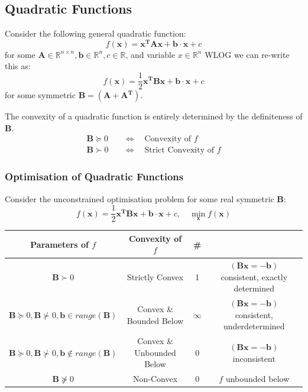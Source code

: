 \subsection{Quadratic Functions}
Consider the following general quadratic function:
\[f(\mathbf{x})=\mathbf{x^{T}Ax+b\cdot x}+c\]
for some $\mathbf{A}\in \mathbb{R}^{n\times n},\mathbf{b}\in
\mathbb{R}^{n},c\in \mathbb{R}$, and variable $x\in \mathbb{R}^{n}$
WLOG we can re-write this as:
\[f(\mathbf{x})=\frac{1}{2}\mathbf{x^{T}Bx+b\cdot x}+c\]
for some symmetric $\mathbf{B}=(\mathbf{A+A^{T}})$.
\begin{theorem}
  The convexity of a quadratic function is entirely determined by the
  definiteness of $\mathbf{B}$.
  \begin{align*}
      \mathbf{B} \succeq 0 \quad &\iff \quad \mbox{Convexity of }f \\
      \mathbf{B} \succ 0 \quad &\iff \quad \mbox{Strict Convexity of }f
  \end{align*}
\end{theorem}
\subsubsection{Optimisation of Quadratic Functions}
Consider the unconstrained optimisation problem for some real symmetric $\mathbf{B}$:
\[f(\mathbf{x})=\frac{1}{2}\mathbf{x^{T}Bx+b\cdot x}+c, \quad \min_{\mathbf{x}}f(\mathbf{x})\]

\begin{tabular}{c c c c}
  \toprule
  Parameters of $f$& Convexity of $f$ & \# &  \\
  \midrule
  $\mathbf{B}\succ 0$ & Strictly Convex & 1 & $\mathbf{(Bx=-b)}$ consistent, exactly determined \\
  $\mathbf{B}\succeq 0,\mathbf{B}\nsucc 0,\mathbf{b}\in range(\mathbf{B})$ & Convex \& Bounded Below & $\infty$ & $(\mathbf{Bx=-b})$ consistent, underdetermined \\
  $\mathbf{B}\succeq 0,\mathbf{B}\nsucc 0, \mathbf{b}\notin range(\mathbf{B})$ & Convex \& Unbounded Below & 0 & $(\mathbf{Bx=-b})$ inconsistent \\
  $\mathbf{B}\nsucceq 0$ & Non-Convex & 0 & $f$ unbounded below \\
  \bottomrule
\end{tabular}

